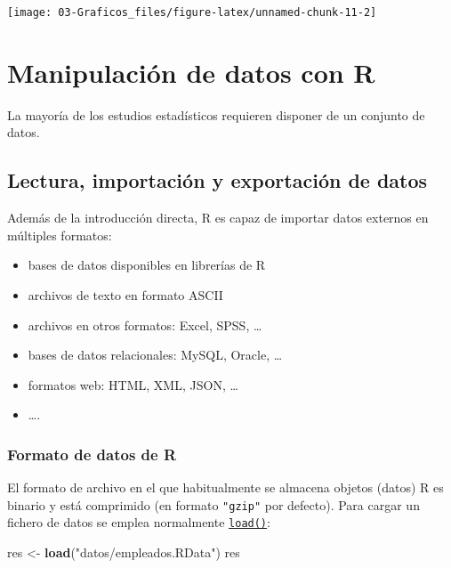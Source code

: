 \documentclass[]{book}
\newenvironment{Shaded}{\begin{snugshade}}{\end{snugshade}}
\newcommand{\KeywordTok}[1]{\textcolor[rgb]{0.13,0.29,0.53}{\textbf{#1}}}
\newcommand{\StringTok}[1]{\textcolor[rgb]{0.31,0.60,0.02}{#1}}
\newcommand{\NormalTok}[1]{#1}
\begin{document}
\begin{center}\texttt{[image: 03-Graficos\_files/figure-latex/unnamed-chunk-11-2]} \end{center}

\chapter{Manipulación de datos con R}\label{manipulacion-de-datos-con-r}

La mayoría de los estudios estadísticos requieren disponer de un
conjunto de datos.

\section{Lectura, importación y exportación de
datos}\label{lectura-importacion-y-exportacion-de-datos}

Además de la introducción directa, R es capaz de importar datos externos
en múltiples formatos:

\begin{itemize}
\item
  bases de datos disponibles en librerías de R
\item
  archivos de texto en formato ASCII
\item
  archivos en otros formatos: Excel, SPSS, \ldots{}
\item
  bases de datos relacionales: MySQL, Oracle, \ldots{}
\item
  formatos web: HTML, XML, JSON, \ldots{}
\item
  \ldots{}.
\end{itemize}

\subsection{Formato de datos de R}\label{formato-de-datos-de-r}

El formato de archivo en el que habitualmente se almacena objetos
(datos) R es binario y está comprimido (en formato \texttt{"gzip"} por
defecto). Para cargar un fichero de datos se emplea normalmente
\href{https://www.rdocumentation.org/packages/base/versions/3.6.1/topics/load}{\texttt{load()}}:

\begin{Shaded}
\begin{Highlighting}[]
\NormalTok{res <-}\StringTok{ }\KeywordTok{load}\NormalTok{(}\StringTok{"datos/empleados.RData"}\NormalTok{)}
\NormalTok{res}
\end{Highlighting}
\end{Shaded}
\end{document}
